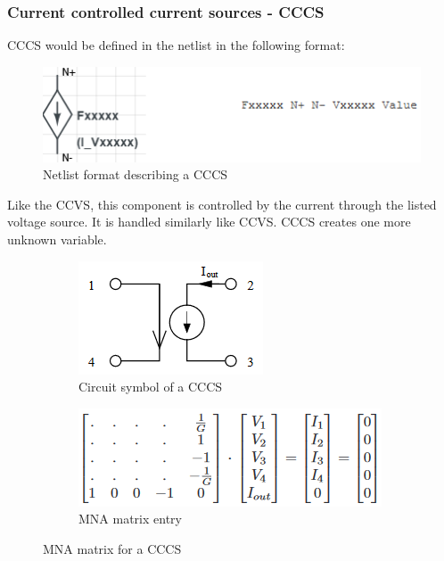 \documentclass[12pt,a4paper]{article}
\begin{document}
\subsubsection{Current controlled current sources - CCCS}
CCCS would be defined in the netlist in the following format: \par
\begin{figure} [h!]
	\centering
	\includegraphics[]{F.png}
	\caption{Netlist format describing a CCCS \cite{MNA}}
\end{figure} 
Like the CCVS, this component is controlled by the current through the listed voltage source. It is handled similarly like CCVS.
CCCS creates one more unknown variable.
\begin{figure} [h!]
	\centering
	\begin{subfigure}{.5\textwidth}
	  \centering
	  \includegraphics[scale=0.8]{F_diagram.PNG}
	  \caption{Circuit symbol of a CCCS}
	  \label{fig:sub1}
	\end{subfigure}%
	\begin{subfigure}{.5\textwidth}
	  \centering
	  \includegraphics[width= \textwidth]{F_matrices.PNG}
	  \caption{MNA matrix entry}
	  \label{fig:sub2}
	\end{subfigure}
	\caption{MNA matrix for a CCCS \cite{jahn_margraf_habchi_jacob_2003}}
	\label{fig:test}
\end{figure}


\pagebreak
\end{document}
